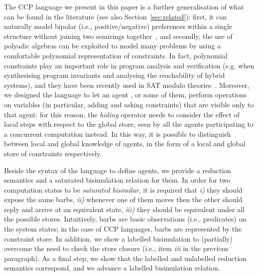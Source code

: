 \documentclass{llncs}
\begin{document}
The CCP language we present in this paper is a further generalisation of what can be found in the literature (see also Section~\ref{sec:related}): first, it can naturally model bipolar (i.e., positive/negative) preferences within a single structure without joining two semirings together~\cite{posneg}, and secondly, the use of polyadic algebras can be exploited to model
many problems by using a comfortable polynomial representation of constraints. In fact, polynomial constraints  play an important role in program analysis and verification (e.g. when synthesising program invariants and analysing the reachability of hybrid systems), and they have been recently used in SAT modulo theories~\cite{smtpolynomial}.
Moreover, we designed the language to let an agent , or some of them, perform operations  on variables (in particular, adding and asking constraints) that are visible only to that agent: for this reason, the \emph{hiding} operator needs to consider the effect of local steps with respect to the global store, seen by all the agents participating to a concurrent computation instead. In this way, it is possible to distinguish between local and global knowledge of agents, in the form of a local and global store of constraints respectively.

Beside the syntax of the language to define agents, we provide a reduction semantics and a saturated bisimulation relation for  them. In order for two computation states to be \emph{saturated bisimilar}, it is required that \emph{i)} they should expose the same barbs, \emph{ii)} whenever one of them moves then the other should reply and arrive at an equivalent state, \emph{iii)} they should be equivalent under all the possible stores.
Intuitively, barbs are basic observations (i.e., predicates) on the system states; in the case of CCP languages, barbs are represented by the constraint store. In addition, we show a labelled bisimulation to (partially) overcome the need to check the store closure (i.e., item \emph{iii} in the previous paragraph). As a final step, we show that the labelled and unlabelled reduction semantics correspond, and we advance a labelled bisimulation relation.
\end{document}
